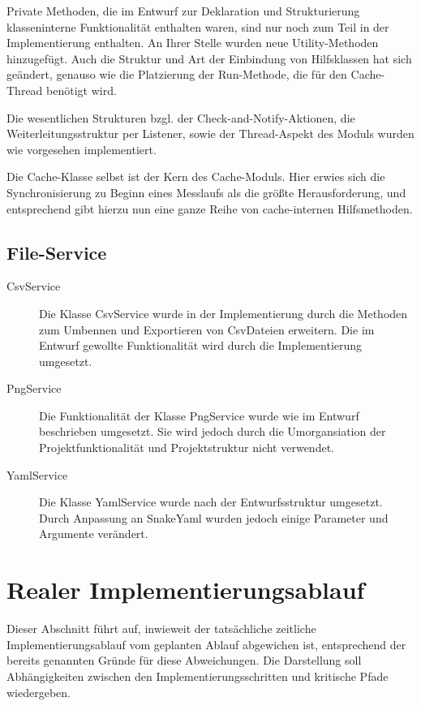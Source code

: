 \documentclass[parskip=full]{scrartcl}
\begin{document}
Private Methoden, die im Entwurf zur Deklaration und Strukturierung klasseninterne Funktionalität enthalten waren, sind nur noch zum Teil in der Implementierung enthalten. An Ihrer Stelle wurden neue Utility-Methoden hinzugefügt. Auch die Struktur und Art der Einbindung von Hilfsklassen hat sich geändert, genauso wie die Platzierung der Run-Methode, die für den Cache-Thread benötigt wird. 

Die wesentlichen Strukturen bzgl. der Check-and-Notify-Aktionen, die Weiterleitungsstruktur per Listener, sowie der Thread-Aspekt des Moduls wurden wie vorgesehen implementiert. 

Die Cache-Klasse selbst ist der Kern des Cache-Moduls. Hier erwies sich die Synchronisierung zu Beginn eines Messlaufs als die größte Herausforderung, und entsprechend gibt hierzu nun eine ganze Reihe von cache-internen Hilfsmethoden. 

\subsection{File-Service}
\begin{description}
\item[CsvService] Die Klasse CsvService wurde in der Implementierung durch die Methoden zum Umbennen und Exportieren von CsvDateien erweitern. Die im Entwurf gewollte Funktionalität wird durch die Implementierung umgesetzt.
\item[PngService] Die Funktionalität der Klasse PngService wurde wie im Entwurf beschrieben umgesetzt. Sie wird jedoch durch die Umorgansiation der Projektfunktionalität und Projektstruktur nicht verwendet.
\item[YamlService] Die Klasse YamlService wurde nach der Entwurfsstruktur umgesetzt. Durch Anpassung an SnakeYaml wurden jedoch einige Parameter und Argumente verändert.

\end{description}

\section{Realer Implementierungsablauf}

Dieser Abschnitt führt auf, inwieweit der tatsächliche zeitliche Implementierungsablauf vom geplanten Ablauf abgewichen ist, entsprechend der bereits genannten Gründe für diese Abweichungen. Die Darstellung soll Abhängigkeiten zwischen den Implementierungsschritten und kritische Pfade wiedergeben.
\end{document}
